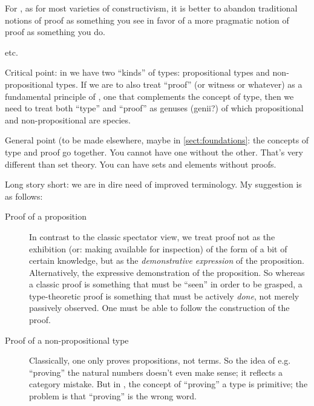 For \HoTT{}, as for most varieties of constructivism, it is better to
abandon traditional notions of proof as something you see in favor of a
more pragmatic notion of proof as something you do.

etc.

Critical point: in \HoTT we have two ``kinds'' of types: propositional
types and non-propositional types.  If we are to also treat ``proof''
(or witness or whatever) as a fundamental principle of \HoTT, one that
complements the concept of type, then we need to treat both ``type''
and ``proof'' as genuses (genii?) of which propositional and non-propositional
are species.

\begin{ednote}
  General point (to be made elsewhere, maybe in
  \cref{sect:foundations}: the concepts of type and proof go together.
  You cannot have one without the other.  That's very different than
  set theory.  You can have sets and elements without proofs.
\end{ednote}



Long story short: we are in dire need of improved terminology.  My
suggestion is as follows:

\begin{description}
\item [Proof of a proposition] In contrast to the classic spectator
  view, we treat proof not as the exhibition (or: making available for
  inspection) of the form of a bit of certain knowledge, but as the
  \textit{demonstrative expression} of the proposition.
  Alternatively, the expressive demonstration of the proposition.  So
  whereas a classic proof is something that must be ``seen'' in order
  to be grasped, a type-theoretic proof is something that must be
  actively \textit{done}, not merely passively observed.  One must be
  able to follow the construction of the proof.

\item [Proof of a non-propositional type] Classically, one only proves
  propositions, not terms.  So the idea of e.g. ``proving'' the
  natural numbers doesn't even make sense; it reflects a category
  mistake.  But in \HoTT, the concept of ``proving'' a type is
  primitive; the problem is that ``proving'' is the wrong word.
\end{description}


